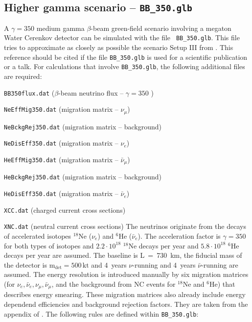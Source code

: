 \subsection*{Higher gamma scenario -- {\tt BB\_350.glb}}

A $\gamma=350$ medium gamma $\beta$-beam green-field scenario involving a megaton Water Cerenkov detector can be simulated with the file {\tt
BB\_350.glb}. This file tries to approximate as closely as possible the scenario {\sf Setup III} from
\cite{Burguet-Castell:2005pa}. This reference
should be cited if the file {\tt BB\_350.glb} is used for a scientific publication or a talk. For calculations that
involve {\tt BB\_350.glb}, the following additional files are required: 
\bi
\item {\tt BB350flux.dat} ($\beta$-beam neutrino flux -- $\gamma=350$ )
\item {\tt NeEffMig350.dat} (migration matrix -- $\nu_\mu$)
\item {\tt NeBckgRej350.dat} (migration matrix -- background)
\item {\tt NeDisEff350.dat} (migration matrix -- $\nu_e$)
\item {\tt HeEffMig350.dat} (migration matrix -- $\bar{\nu}_\mu$)
\item {\tt HeBckgRej350.dat} (migration matrix -- background)
\item {\tt HeDisEff350.dat} (migration matrix -- $\bar{\nu}_e$)
\item {\tt XCC.dat} (charged current cross sections)
\item {\tt XNC.dat} (neutral current cross sections)
\ei
The neutrinos originate from the decays of accelerated isotopes $^{18}$Ne ($\nu_e$) and $^6$He ($\bar{\nu}_e$).
The acceleration factor is $\gamma=350$ for both types of isotopes and $2.2\cdot10^{18}$ $^{18}$Ne decays per
year and $5.8\cdot10^{18}$ $^{6}$He decays per year are assumed. The baseline is L~=~730~km, the
fiducial mass of the detector is $\mathrm{m_{det} = 500 \,kt}$ and 4~years $\nu$-running and 4~years
$\bar{\nu}$-running are assumed. The energy resolution is introduced manually by
six migration matrices (for $\nu_e , \bar{\nu}_e ,\nu_{\mu} ,\bar{\nu}_\mu$, and the background from NC events
for $^{18}$Ne and $^6$He) that describes energy smearing. These migration matrices also already include energy
dependend efficiencies and background rejection factors. They are taken from the appendix of
\cite{Burguet-Castell:2005pa}. The following rules are defined within {\tt BB\_350.glb}:
